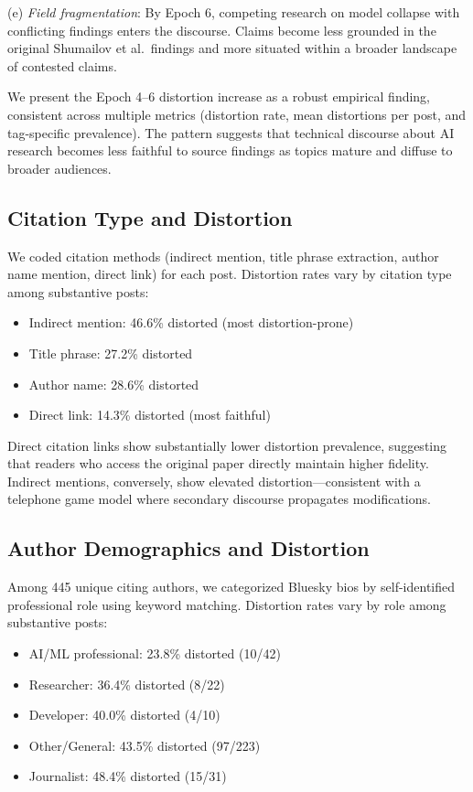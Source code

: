 \documentclass[twocolumn,11pt]{article}
\begin{document}
(e) \textit{Field fragmentation}: By Epoch 6, competing research on model collapse with conflicting findings enters the discourse. Claims become less grounded in the original Shumailov et al.\ findings and more situated within a broader landscape of contested claims.

We present the Epoch 4--6 distortion increase as a robust empirical finding, consistent across multiple metrics (distortion rate, mean distortions per post, and tag-specific prevalence). The pattern suggests that technical discourse about AI research becomes less faithful to source findings as topics mature and diffuse to broader audiences.

\subsection{Citation Type and Distortion}

We coded citation methods (indirect mention, title phrase extraction, author name mention, direct link) for each post. Distortion rates vary by citation type among substantive posts:
\begin{itemize}
\item Indirect mention: 46.6\% distorted (most distortion-prone)
\item Title phrase: 27.2\% distorted
\item Author name: 28.6\% distorted
\item Direct link: 14.3\% distorted (most faithful)
\end{itemize}

Direct citation links show substantially lower distortion prevalence, suggesting that readers who access the original paper directly maintain higher fidelity. Indirect mentions, conversely, show elevated distortion—consistent with a telephone game model where secondary discourse propagates modifications.

\subsection{Author Demographics and Distortion}

Among 445 unique citing authors, we categorized Bluesky bios by self-identified professional role using keyword matching. Distortion rates vary by role among substantive posts:
\begin{itemize}
\item AI/ML professional: 23.8\% distorted (10/42)
\item Researcher: 36.4\% distorted (8/22)
\item Developer: 40.0\% distorted (4/10)
\item Other/General: 43.5\% distorted (97/223)
\item Journalist: 48.4\% distorted (15/31)
\end{itemize}
\end{document}
